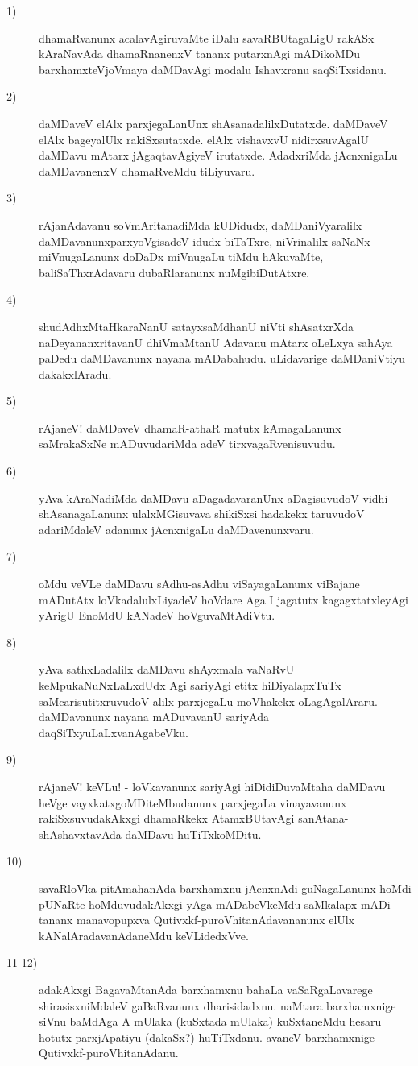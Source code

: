 \begin{description}
\item [1)] dhamaRvanunx acalavAgiruvaMte iDalu savaRBUtagaLigU rakASx kAraNa\-vAda dhamaRnanenxV tananx putarx\-nAgi mADikoMDu barxhamxteVjoVmaya daMDavAgi modalu Ishavxranu saqSiTxsidanu.
\item [2)] daMDaveV elAlx parxjegaLanUnx shAsanadalilxDutatxde. daMDaveV elAlx bageyalUlx rakiSxsutatxde. elAlx vishavxvU nidirxsuvAgalU daMDavu mAtarx jAgaqtavAgiyeV irutatxde. AdadxriMda jAcnxnigaLu daMDa\-vanenxV dhamaRveMdu tiLiyuvaru.
\item [3)] rAjanAdavanu soVmAritanadiMda kUDidudx, daMDaniVyaralilx daMDavanunx\break parxyoVgisadeV idudx biTaTxre, niVrinalilx saNaNx miVnugaLanunx doDaDx miVnu\-gaLu tiMdu hAkuvaMte, baliSaThxrAdavaru du\-baR\-laranunx nuMgibiDutAtxre.
\item [4)] shudAdhxMtaHkaraNanU satayxsaMdhanU niVti shAsatxrXda naDeyananxritavanU dhiVmaMtanU Adavanu mAtarx oLeLxya sahAya paDedu daMDavanunx nayana mADa\-bahudu. uLidavarige daMDaniVtiyu dakakx\-lAradu. 
\item [5)] rAjaneV! daMDaveV dhamaR-athaR matutx kAmagaLanunx saMrakaSxNe mADuvudariMda adeV tirxvagaR\-venisuvudu.
\item [6)] yAva kAraNadiMda daMDavu aDagadavaranUnx aDagisuvudoV vidhi shAsanagaLanunx ulalxMGisuvava shikiSxsi hadakekx taruvudoV adariMdaleV adanunx jAcnxnigaLu daMDavenunxvaru.
\item [7)] oMdu veVLe daMDavu sAdhu-asAdhu viSayagaLanunx viBajane mADutAtx loVkadalulxLiyadeV hoVdare Aga I jagatutx kagagxtatxleyAgi yArigU EnoMdU kANadeV hoVguvaMtAdiVtu.
\item [8)] yAva sathxLadalilx daMDavu shAyxmala vaNaRvU keMpukaNuNxLaLxdUdx Agi sariyAgi etitx hiDiyalapxTuTx saMcarisutitxruvudoV alilx parxjegaLu moVhakekx oLagAga\-lAraru. daMDavanunx nayana mADuva\-vanU sariyAda daqSiTxyuLaLxvanAgabeVku.
\item [9)] rAjaneV! keVLu! - loVkavanunx sariyAgi hiDidiDuvaMtaha daMDavu heVge vayxkatxgoMDiteMbu\-danunx parxjegaLa vinayavanunx rakiSxsuvudakAkxgi dhamaRkekx AtamxBUtavAgi sanAtana-shAshavxtavAda daM\-Davu huTiTxkoMDitu.
\item [10)] savaRloVka pitAmahanAda barxhamxnu jAcnxnAdi guNagaLanunx hoMdi pUNaRte hoMduvudakAkxgi yAga mADabeVkeMdu saMkalapx mADi tananx manavopupxva Qutivxkf-puroVhitanAdavananunx elUlx kANalAradava\-nAdaneMdu keVLidedxVve.
\item [11-12)] adakAkxgi BagavaMtanAda barxhamxnu bahaLa vaSaRgaLavarege shirasisxniMdaleV gaBaRvanunx dharisi\-dadxnu. naMtara barxhamxnige siVnu baMdAga A mUlaka (kuSxtada mUlaka) kuSxtaneMdu hesaru hotutx parxjA\-patiyu (dakaSx?) huTiTxdanu. avaneV barxhamxnige Qutivxkf-puroVhitanAdanu.


\end{description}
